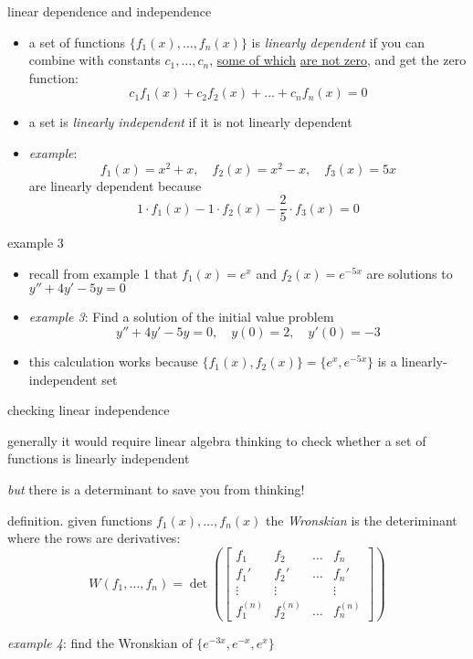 \documentclass{beamer}
\begin{document}
\begin{frame}{linear dependence and independence}

\begin{itemize}
\item a set of functions $\{f_1(x),\dots,f_n(x)\}$ is \emph{linearly dependent} if you can combine with constants $c_1,\dots,c_n$, \underline{some of which} \underline{are not zero}, and get the zero function:
    $$c_1 f_1(x) + c_2 f_2(x) + \dots + c_n f_n(x) = 0$$
\item a set is \emph{linearly independent} if it is not linearly dependent
\item \emph{example}:
    $$f_1(x) = x^2 + x, \quad f_2(x) = x^2 - x, \quad f_3(x) = 5x$$
are linearly dependent because
    $$1\cdot f_1(x) - 1\cdot f_2(x) - \frac{2}{5}\cdot f_3(x) = 0$$
\end{itemize}
\end{frame}


\begin{frame}{example 3}

\begin{itemize}
\item recall from example 1 that $f_1(x)=e^x$ and $f_2(x)=e^{-5x}$ are solutions to $y'' + 4 y' - 5 y = 0$
\item \emph{example 3}:  Find a solution of the initial value problem
    $$y'' + 4 y' - 5 y = 0, \quad y(0) = 2, \quad y'(0) = -3$$

\vspace{35mm}
\item this calculation works because $\{f_1(x),f_2(x)\}=\{e^x,e^{-5x}\}$ is a linearly-independent set
\end{itemize}
\end{frame}


\begin{frame}{checking linear independence}

\begin{itemize}
\item generally it would require linear algebra thinking to check whether a set of functions is linearly independent
\item \emph{but} there is a determinant to save you from thinking!
\item definition.  given functions $f_1(x),\dots,f_n(x)$ the \emph{Wronskian} is the deteriminant where the rows are derivatives:
    $$W(f_1,\dots,f_n) = \det \left(\begin{bmatrix}
    f_1 & f_2 & \dots & f_n \\
    f_1' & f_2' & \dots & f_n' \\
    \vdots & \vdots & & \vdots \\
    f_1^{(n)} & f_2^{(n)} & \dots & f_n^{(n)}
    \end{bmatrix}\right)$$
\begin{minipage}[t]{0.25\textwidth}
\item \emph{example 4}: find the Wronskian of $\{e^{-3x},e^{-x},e^{x}\}$
\end{minipage}

\vspace{15mm}
\end{itemize}
\end{frame}
\end{document}
